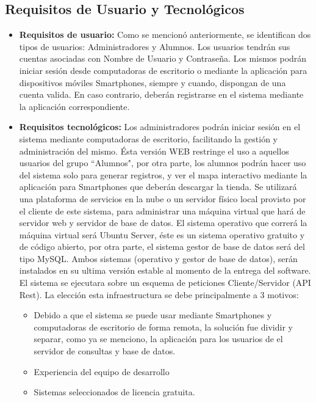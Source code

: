     \subsection{Requisitos de Usuario y Tecnológicos}
      \begin{itemize}
        \item \textbf{Requisitos de usuario:} Como se mencionó anteriormente, se identifican dos tipos de usuarios: Administradores y Alumnos. Los usuarios tendrán sus cuentas asociadas con Nombre de Usuario y Contraseña. Los mismos podrán iniciar sesión desde computadoras de escritorio o mediante la aplicación para dispositivos móviles Smartphones, siempre y cuando, dispongan de una cuenta valida. En caso contrario, deberán registrarse en el sistema mediante la aplicación correspondiente.

        \item \textbf{Requisitos tecnológicos:} Los administradores podrán iniciar sesión en el sistema mediante computadoras de escritorio, facilitando la gestión y administración del mismo. Ésta versión WEB restringe el uso a aquellos usuarios del grupo ``Alumnos", por otra parte, los alumnos podrán hacer uso del sistema solo para generar registros, y ver el mapa interactivo mediante la aplicación para Smartphones que deberán descargar la tienda.
        Se utilizará una plataforma de servicios en la nube o un servidor físico local provisto por el cliente de este sistema, para administrar una máquina virtual que hará de servidor web y servidor de base de datos. El sistema operativo que correrá la máquina virtual será Ubuntu Server, éste es un sistema operativo gratuito y de código abierto, por otra parte, el sistema gestor de base de datos será del tipo MySQL. Ambos sistemas (operativo y gestor de base de datos), serán instalados en su ultima versión estable al momento de la entrega del software.
        El sistema se ejecutara sobre un esquema de peticiones Cliente/Servidor (API Rest). La elección esta infraestructura se debe principalmente a 3 motivos: 
        \begin{itemize}
          \item Debido a que el sistema se puede usar mediante Smartphones y computadoras de escritorio de forma remota, la solución fue dividir y separar, como ya se menciono, la aplicación para los usuarios de el servidor de consultas y base de datos.
          \item Experiencia del equipo de desarrollo 
          \item Sistemas seleccionados de licencia gratuita.
        \end{itemize}
      \end{itemize}

